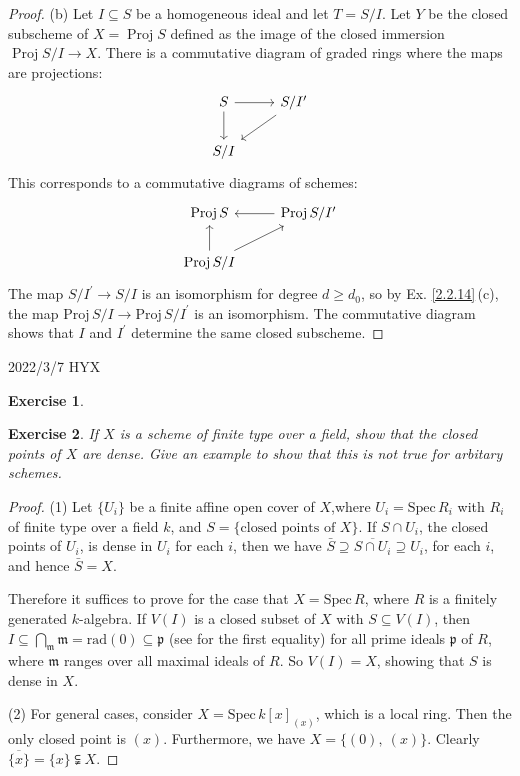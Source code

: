 \documentclass{amsart}
\newtheorem{exe}{Exercise}[subsection]
\theoremstyle{remark}\newtheorem{rmk}[theorem]{Remark}
\begin{document}
\begin{proof}
	(b) Let $I \subseteq S$ be a homogeneous ideal and let $T=S / I $. Let $Y$ be the closed subscheme of $X=\operatorname{Proj} S$ defined as the image of the closed immersion $\operatorname{Proj} S / I \rightarrow X $. There is a commutative diagram of graded rings where the maps are projections:
	\begin{equation*}
		\begin{tikzcd}
		S \arrow[d] \arrow[r] & S / I^{\prime} \arrow[ld] \\
		S / I                 &                          
		\end{tikzcd}
	\end{equation*}
	This corresponds to a commutative diagrams of schemes:
	\begin{equation*}
		\begin{tikzcd}
		\operatorname{Proj} S                     & \operatorname{Proj} S / I^{\prime} \arrow[l] \\
		\operatorname{Proj} S / I \arrow[u] \arrow[ru] &                                             
		\end{tikzcd}
	\end{equation*}
	The map $S / I^{\prime} \rightarrow S / I$ is an isomorphism for degree $d \geq d_{0}$, so by Ex. \ref{2.2.14}\,(c), the map $\mathrm{Proj}\,S / I \rightarrow \mathrm{Proj}\, S / I^{\prime}$ is an isomorphism. The commutative diagram shows that $I$ and $I^{\prime}$ determine the same closed subscheme.
\end{proof}
2022/3/7 HYX
\begin{exe}
	
\end{exe}
\begin{exe}
If $X$ is a scheme of finite type over a field, show that the closed points of $X$ are dense. Give an example to show that this is not true for arbitary schemes.
\end{exe}
\begin{proof}
(1) Let $\{U_i\}$ be a finite affine open cover of $X$,where $U_i=\mathrm{Spec}\,R_i$ with $R_i$ of finite type over a field $k$, and $S=\{
\text{closed points of }X\}$. If $S\cap U_i$, the closed points of $U_i$, is dense in $U_i$ for each $i$, then we have $\bar{S}\supseteq\overline{S\cap U_i}\supseteq U_i$, for each $i$, and hence $\bar{S}=X$.

Therefore it suffices to prove for the case that $X=\mathrm{Spec}\,R$, where $R$ is a finitely generated $k$-algebra. If $V(I)$ is a closed subset of $X$ with $S\subseteq V(I)$,
then $I\subseteq\bigcap_{\mathfrak{m}}\mathfrak{m}=\mathrm{rad}(0)\subseteq\mathfrak{p}$ (see \cite[Ch. 1, Ex. 4, P. 11]{ATIY} for the first equality) for all prime ideals $\mathfrak{p}$ of $R$, where $\mathfrak{m}$ ranges over all maximal ideals of $R$. So $V(I)=X$, showing
that $S$ is dense in $X$.

(2) For general cases, consider $X=\mathrm{Spec}\,k[x]_{(x)}$, which is a local ring. Then the only closed
point is $(x)$. Furthermore, we have $X=\{(0),\ (x)\}$. Clearly $\overline{\{x\}}=\{x\}\subsetneqq X$.
\end{proof}
\end{document}
